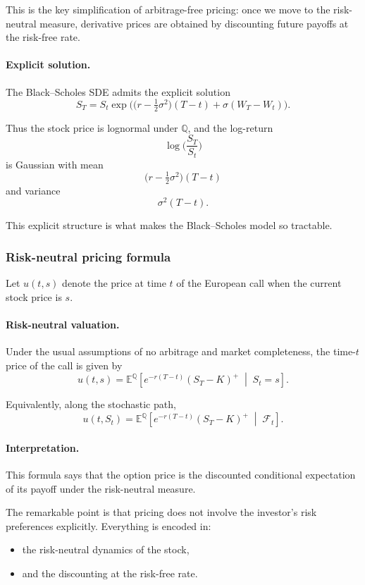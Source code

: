 \documentclass[11pt]{article}
\newcommand{\Qbb}{\mathbb{Q}}
\newcommand{\E}{\mathbb{E}}
\theoremstyle{plain}
\theoremstyle{definition}
\theoremstyle{remark}
\begin{document}
This is the key simplification of arbitrage-free pricing:
once we move to the risk-neutral measure, derivative prices are obtained
by discounting future payoffs at the risk-free rate.

\paragraph{Explicit solution.}
The Black--Scholes SDE admits the explicit solution
\[
S_T
=
S_t\exp\!\Big(
\big(r-\tfrac12\sigma^2\big)(T-t)+\sigma(W_T-W_t)
\Big).
\]

Thus the stock price is lognormal under \(\Qbb\), and the log-return
\[
\log\Big(\frac{S_T}{S_t}\Big)
\]
is Gaussian with mean
\[
\big(r-\tfrac12\sigma^2\big)(T-t)
\]
and variance
\[
\sigma^2(T-t).
\]

This explicit structure is what makes the Black--Scholes model so
tractable.

\subsubsection{Risk-neutral pricing formula}

Let \(u(t,s)\) denote the price at time \(t\) of the European call when
the current stock price is \(s\).

\paragraph{Risk-neutral valuation.}
Under the usual assumptions of no arbitrage and market completeness, the
time-\(t\) price of the call is given by
\[
u(t,s)
=
\E^\Qbb\!\left[
e^{-r(T-t)}(S_T-K)^+
\;\middle|\;
S_t=s
\right].
\]

Equivalently, along the stochastic path,
\[
u(t,S_t)
=
\E^\Qbb\!\left[
e^{-r(T-t)}(S_T-K)^+
\;\middle|\;
\mathcal F_t
\right].
\]

\paragraph{Interpretation.}
This formula says that the option price is the discounted conditional
expectation of its payoff under the risk-neutral measure.

The remarkable point is that pricing does not involve the investor's
risk preferences explicitly.
Everything is encoded in:
\begin{itemize}[leftmargin=1.4em]
    \item the risk-neutral dynamics of the stock,
    \item and the discounting at the risk-free rate.
\end{itemize}
\end{document}
